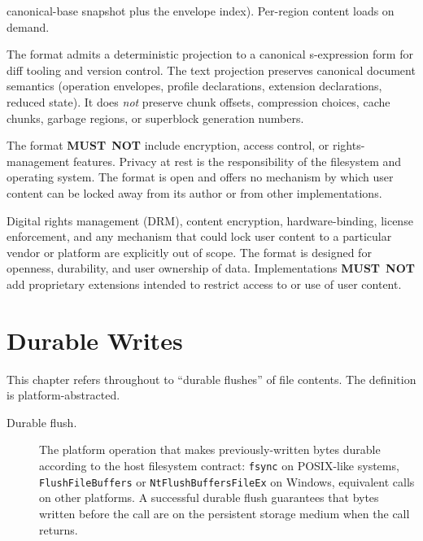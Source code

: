 \documentclass[11pt,letterpaper]{report}
\newcommand{\MUSTNOT}{\textbf{MUST}\nobreak\ \textbf{NOT}}
\begin{document}
\begin{description}
    canonical-base snapshot plus the envelope index). Per-region
    content loads on demand.
  \item[Deterministic text projection of semantic content.] The
    format admits a deterministic projection to a canonical
    s-expression form for diff tooling and version control. The
    text projection preserves canonical document semantics
    (operation envelopes, profile declarations, extension
    declarations, reduced state). It does \emph{not} preserve
    chunk offsets, compression choices, cache chunks, garbage
    regions, or superblock generation numbers.
  \item[No encryption, no DRM.] The format \MUSTNOT{} include
    encryption, access control, or rights-management features.
    Privacy at rest is the responsibility of the filesystem and
    operating system. The format is open and offers no mechanism by
    which user content can be locked away from its author or from
    other implementations.
\end{description}

\begin{nongoal}
  Digital rights management (DRM), content encryption,
  hardware-binding, license enforcement, and any mechanism that
  could lock user content to a particular vendor or platform are
  explicitly out of scope. The format is designed for openness,
  durability, and user ownership of data. Implementations \MUSTNOT{}
  add proprietary extensions intended to restrict access to or use
  of user content.
\end{nongoal}

\section{Durable Writes}
\label{sec:format:durable}

This chapter refers throughout to ``durable flushes'' of file
contents. The definition is platform-abstracted.

\begin{description}
  \item[Durable flush.] The platform operation that makes
    previously-written bytes durable according to the host
    filesystem contract: \texttt{fsync} on POSIX-like systems,
    \texttt{FlushFileBuffers} or \texttt{NtFlushBuffersFileEx} on
    Windows, equivalent calls on other platforms. A successful
    durable flush guarantees that bytes written before the call are
    on the persistent storage medium when the call returns.
\end{description}
\end{document}

